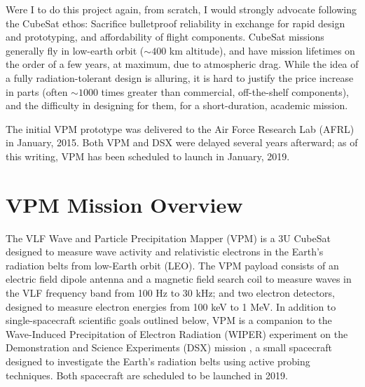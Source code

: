 Were I to do this project again, from scratch, I would strongly advocate following the CubeSat ethos: Sacrifice bulletproof reliability in exchange for rapid design and prototyping, and affordability of flight components. CubeSat missions generally fly in low-earth orbit ($\sim 400$ km altitude), and have mission lifetimes on the order of a few years, at maximum, due to atmospheric drag. While the idea of a fully radiation-tolerant design is alluring, it is hard to justify the price increase in parts (often $\sim 1000$ times greater than commercial, off-the-shelf components), and the difficulty in designing for them, for a short-duration, academic mission.

The initial VPM prototype was delivered to the Air Force Research Lab (AFRL) in January, 2015. Both VPM and DSX were delayed several years afterward; as of this writing, VPM has been scheduled to launch in January, 2019.

\section{VPM Mission Overview}
The VLF Wave and Particle Precipitation Mapper (VPM) is a 3U CubeSat designed to measure wave activity and relativistic electrons in the Earth's radiation belts from low-Earth orbit (LEO). The VPM payload consists of an electric field dipole antenna and a magnetic field search coil to measure waves in the VLF frequency band from 100 Hz to 30 kHz; and two electron detectors, designed to measure electron energies from 100 keV to 1 MeV. In addition to single-spacecraft scientific goals outlined below, VPM is a companion to the Wave-Induced Precipitation of Electron Radiation (WIPER) experiment on the Demonstration and Science Experiments (DSX) mission \citep{Schoenberg2006, Spanjers2006}, a small spacecraft designed to investigate the Earth's radiation belts using active probing techniques. Both spacecraft are scheduled to be launched in 2019.

